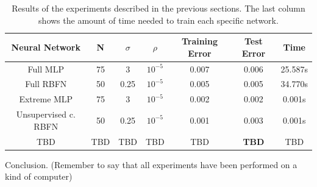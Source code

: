 \documentclass[a4paper]{article}
\numberwithin{equation}{section} %
\numberwithin{figure}{section} %
\numberwithin{table}{section} %
\theoremstyle{definition}
\begin{document}
\begin{table}
	\centering
	\begin{tabular}{*{7}{c}}
		Neural Network & N & $\sigma$ & $\rho$ & Training Error & Test Error & Time \\
		\hline
		Full MLP & 75 & 3 & $10^{-5}$ & 0.007 & 0.006 & 25.587s \\
		Full RBFN & 50 & 0.25 & $10^{-5}$ & 0.005 & 0.005 & 34.770s \\
		Extreme MLP & 75 & 3 & $10^{-5}$ & 0.002 & 0.002 & 0.001s \\
		Unsupervised c. RBFN & 50 & 0.25 & $10^{-5}$ & 0.001 & 0.003 & 0.001s \\
		TBD & TBD & TBD & TBD & TBD & \textbf{TBD} & TBD \\
	\end{tabular}
	\caption{Results of the experiments described in the previous sections.
		The last column shows the amount of time needed to train each
		specific network.}
	\label{tab:experiments}
\end{table}

Conclusion. (Remember to say that all experiments have been performed on
a kind of computer)
\end{document}
